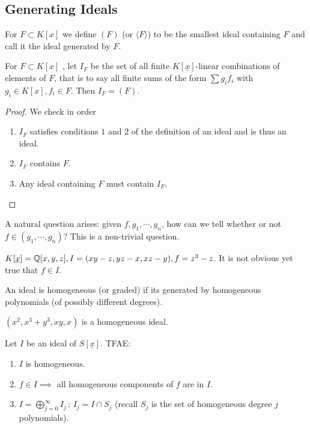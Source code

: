 \subsection{Generating Ideals}

\begin{definition}
For $F \subset K[x]$ we define $(F) $ (or $\langle F \rangle$) to be the smallest ideal containing $F$ and call it the ideal generated by $F$.
\end{definition}

\begin{proposition}
For $F \subset K [ x] $ , let $I_F$ be the set of all finite $K[ \underline{x} ]$-linear combinations of elements of $F$, that is to say all finite sums of the form $\sum g_i f_i$ with $g_i \in K[x], f_i \in F$. Then $I_F = (F)$.
\end{proposition}
\begin{proof}
We check in order
\begin{enumerate}
    \item $I_F$ satisfies conditions $1$ and $2$ of the definition of an ideal and is thus an ideal.
    \item $I_F$ contains $F$.
    \item Any ideal containing $F$ must contain $I_F$.
\end{enumerate}
\end{proof}

A natural question arises: given $f, g_1 ,\cdots , g_n$, how can we tell whether or not $f \in (g_1, \cdots, g_n)$? This is a non-trivial question.

\begin{example}
$K[\underline{x}] = \mathbb{Q}[x,y,z] , I = ( xy-z, yz-x, xz-y), f = z^3 - z$. It is not obvious yet true that $f \in I$.
\end{example}

\begin{definition}
An ideal is homogeneous (or graded) if its generated by homogeneous polynomials (of possibly different degrees).
\end{definition}

\begin{example}
$(x^2, x^3 + y^3, xy, x)$ is a homogeneous ideal.
\end{example}

\begin{proposition}
Let $I$ be an ideal of $S[\underline{x}]$. TFAE:
\begin{enumerate}
    \item $I$ is homogeneous.
    \item $f \in I \implies$ all homogeneous components of $f$ are in $I$.
    \item $I = \bigoplus_{j=0}^\infty I_j \,; \, I_j = I\cap S_j$ (recall $S_j$ is the set of homogeneous degree $j$ polynomials).
\end{enumerate}
\end{proposition}

